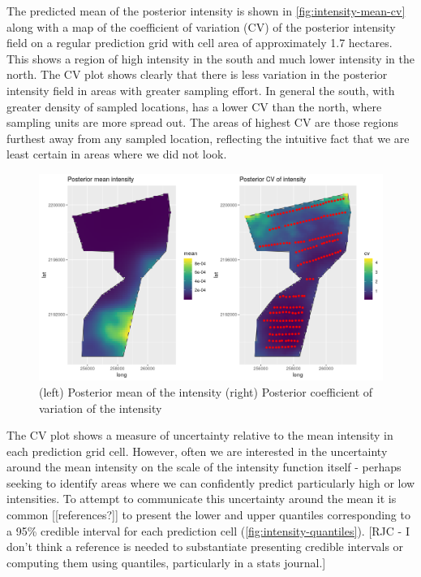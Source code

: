 \documentclass[preprint,12pt]{elsarticle}
\begin{document}

The predicted mean of the posterior intensity is shown in \autoref{fig:intensity-mean-cv} along with a map of the coefficient of variation (CV) of the posterior intensity field on a regular prediction grid with cell area of approximately 1.7 hectares.  This shows a region of high intensity in the south and much lower intensity in the north.  The CV plot shows clearly that there is less variation in the posterior intensity field in areas with greater sampling effort.  In general the south, with greater density of sampled locations, has a lower CV than the north, where sampling units are more spread out.  The areas of highest CV are those regions furthest away from any sampled location, reflecting the intuitive fact that we are least certain in areas where we did not look.

\begin{figure}
	\includegraphics[scale=0.5]{figures/intensity_mean_cv.png}
	\caption{(left) Posterior mean of the intensity (right) Posterior coefficient of variation of the intensity}
	\label{fig:intensity-mean-cv}
\end{figure}

The CV plot shows a measure of uncertainty relative to the mean intensity in each prediction grid cell.  However, often we are interested in the uncertainty around the mean intensity on the scale of the intensity function itself - perhaps seeking to identify areas where we can confidently predict particularly high or low intensities.  To attempt to communicate this uncertainty around the mean it is common [[references?]] to present the lower and upper quantiles corresponding to a 95\% credible interval for each prediction cell (\autoref{fig:intensity-quantiles}). [RJC - I don't think a reference is needed to substantiate presenting credible intervals or computing them using quantiles, particularly in a stats journal.]
\end{document}
